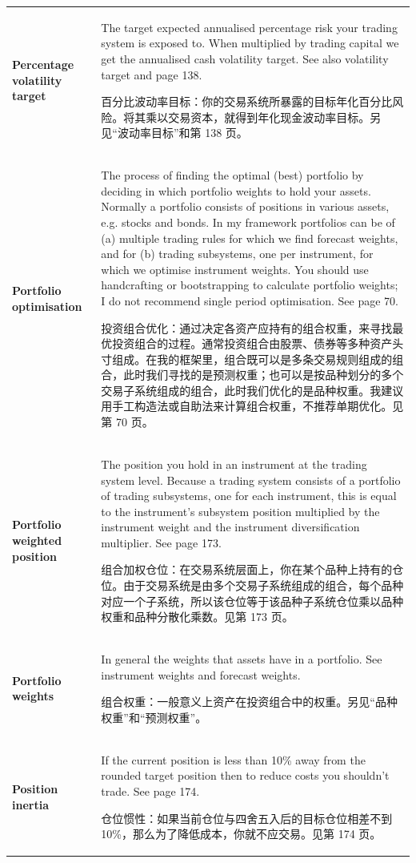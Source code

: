 \begin{chinesetableblock}
{\begin{longtable}{@{}>{\raggedright\arraybackslash\bfseries} p{}>{\raggedright\arraybackslash} p{}@{}}
Percentage volatility target & The target expected annualised percentage risk your trading system is exposed to. When multiplied by trading capital we get the annualised cash volatility target. See also volatility target and page 138. \par 百分比波动率目标：你的交易系统所暴露的目标年化百分比风险。将其乘以交易资本，就得到年化现金波动率目标。另见“波动率目标”和第 138 页。 \\[0.65em]
Portfolio optimisation & The process of finding the optimal (best) portfolio by deciding in which portfolio weights to hold your assets. Normally a portfolio consists of positions in various assets, e.g. stocks and bonds. In my framework portfolios can be of (a) multiple trading rules for which we find forecast weights, and for (b) trading subsystems, one per instrument, for which we optimise instrument weights. You should use handcrafting or bootstrapping to calculate portfolio weights; I do not recommend single period optimisation. See page 70. \par 投资组合优化：通过决定各资产应持有的组合权重，来寻找最优投资组合的过程。通常投资组合由股票、债券等多种资产头寸组成。在我的框架里，组合既可以是多条交易规则组成的组合，此时我们寻找的是预测权重；也可以是按品种划分的多个交易子系统组成的组合，此时我们优化的是品种权重。我建议用手工构造法或自助法来计算组合权重，不推荐单期优化。见第 70 页。 \\[0.65em]
Portfolio weighted position & The position you hold in an instrument at the trading system level. Because a trading system consists of a portfolio of trading subsystems, one for each instrument, this is equal to the instrument’s subsystem position multiplied by the instrument weight and the instrument diversification multiplier. See page 173. \par 组合加权仓位：在交易系统层面上，你在某个品种上持有的仓位。由于交易系统是由多个交易子系统组成的组合，每个品种对应一个子系统，所以该仓位等于该品种子系统仓位乘以品种权重和品种分散化乘数。见第 173 页。 \\[0.65em]
Portfolio weights & In general the weights that assets have in a portfolio. See instrument weights and forecast weights. \par 组合权重：一般意义上资产在投资组合中的权重。另见“品种权重”和“预测权重”。 \\[0.65em]
Position inertia & If the current position is less than 10\% away from the rounded target position then to reduce costs you shouldn’t trade. See page 174. \par 仓位惯性：如果当前仓位与四舍五入后的目标仓位相差不到 10\%，那么为了降低成本，你就不应交易。见第 174 页。 \\[0.65em]

\end{longtable}}
\end{chinesetableblock}
